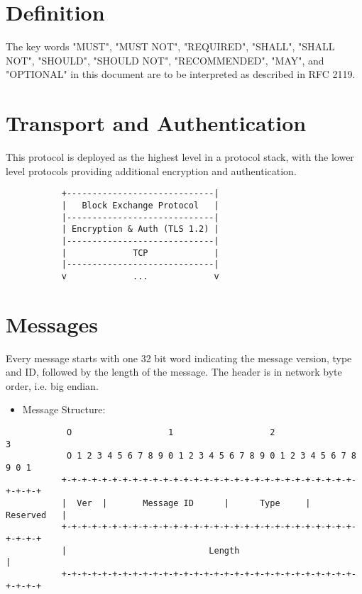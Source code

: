 \section{Definition}

The key words "MUST", "MUST NOT", "REQUIRED", "SHALL", "SHALL NOT",
"SHOULD", "SHOULD NOT", "RECOMMENDED", "MAY", and "OPTIONAL" in this
document are to be interpreted as described in RFC 2119.


\section{Transport and Authentication}

This protocol is deployed as the highest level in a protocol stack, with
the lower level protocols providing additional encryption and authentication.

\begin{verbatim}
           +-----------------------------|
           |   Block Exchange Protocol   |
           |-----------------------------|
           | Encryption & Auth (TLS 1.2) |
           |-----------------------------|
           |             TCP             |
           |-----------------------------|
           v             ...             v
\end{verbatim}

\section{Messages}

Every message starts with one 32 bit word indicating the message version,
type and ID, followed by the length of the message. The header is in
network byte order, i.e. big endian.

\begin{itemize}
 \item Message Structure:
\end{itemize}

\begin{verbatim}
            O                   1                   2                   3
            O 1 2 3 4 5 6 7 8 9 0 1 2 3 4 5 6 7 8 9 0 1 2 3 4 5 6 7 8 9 0 1
           +-+-+-+-+-+-+-+-+-+-+-+-+-+-+-+-+-+-+-+-+-+-+-+-+-+-+-+-+-+-+-+-+
           |  Ver  |       Message ID      |      Type     |    Reserved   |
           +-+-+-+-+-+-+-+-+-+-+-+-+-+-+-+-+-+-+-+-+-+-+-+-+-+-+-+-+-+-+-+-+
           |                            Length                             |
           +-+-+-+-+-+-+-+-+-+-+-+-+-+-+-+-+-+-+-+-+-+-+-+-+-+-+-+-+-+-+-+-+
\end{verbatim}


